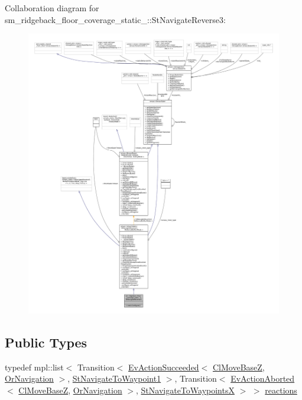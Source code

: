 Collaboration diagram for sm\+\_\+ridgeback\+\_\+floor\+\_\+coverage\+\_\+static\+\_\+:\+:St\+Navigate\+Reverse3\+:
\nopagebreak
\begin{figure}[H]
\begin{center}
\leavevmode
\includegraphics[width=350pt]{structsm__ridgeback__floor__coverage__static__1_1_1StNavigateReverse3__coll__graph}
\end{center}
\end{figure}
\subsection*{Public Types}
\begin{DoxyCompactItemize}
\item 
typedef mpl\+::list$<$ Transition$<$ \hyperlink{structsmacc_1_1default__events_1_1EvActionSucceeded}{Ev\+Action\+Succeeded}$<$ \hyperlink{classcl__move__base__z_1_1ClMoveBaseZ}{Cl\+Move\+BaseZ}, \hyperlink{classsm__ridgeback__floor__coverage__static__1_1_1OrNavigation}{Or\+Navigation} $>$, \hyperlink{structsm__ridgeback__floor__coverage__static__1_1_1StNavigateToWaypoint1}{St\+Navigate\+To\+Waypoint1} $>$, Transition$<$ \hyperlink{structsmacc_1_1default__events_1_1EvActionAborted}{Ev\+Action\+Aborted}$<$ \hyperlink{classcl__move__base__z_1_1ClMoveBaseZ}{Cl\+Move\+BaseZ}, \hyperlink{classsm__ridgeback__floor__coverage__static__1_1_1OrNavigation}{Or\+Navigation} $>$, \hyperlink{structsm__ridgeback__floor__coverage__static__1_1_1StNavigateToWaypointsX}{St\+Navigate\+To\+WaypointsX} $>$ $>$ \hyperlink{structsm__ridgeback__floor__coverage__static__1_1_1StNavigateReverse3_a02957f2ef7048ec2298b5137e46ea558}{reactions}
\end{DoxyCompactItemize}
